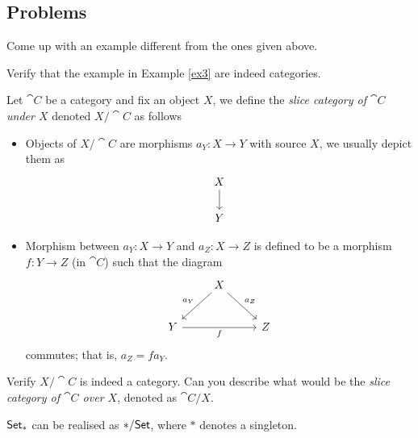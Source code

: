 

\subsection{Problems}
\vspace{0.1in}

\begin{problem}\label{prob 1.1}
Come up with an example different from the ones given above.
\end{problem}

\vspace{0.1in}

\begin{problem}\label{prob 1.2}
Verify that the example in Example \ref{ex3} are indeed categories.
\end{problem}

\vspace{0.1in}

\begin{problem}\label{prob 1.3}
Let $\cat{C}$ be a category and fix an object $X$, we define the \emph{slice category of $\cat{C}$ under $X$} denoted $X/\cat{C}$ as follows
\begin{itemize}
\item Objects of $X/\cat{C}$ are morphisms $a_Y:X \to Y$ with source $X$, we usually depict them as
\[\begin{tikzcd}
X \arrow[d]\\
Y          
\end{tikzcd}\]
\item Morphism between $a_Y: X \to Y$ and $a_Z: X \to Z$ is defined to be a morphism $f: Y \to Z$ (in $\cat{C}$) such that the diagram
\[\begin{tikzcd}
                   & X \arrow[ld, "a_Y"'] \arrow[rd, "a_Z"] &   \\[0.5em]
Y \arrow[rr, "f"'] &                                        & Z
\end{tikzcd}\]
commutes; that is, $a_Z = fa_Y$.
\end{itemize}
Verify $X/\cat{C}$ is indeed a category. Can you describe what would be the \emph{slice category of $\cat{C}$ over $X$}, denoted as $\cat{C}/X$.

\vspace*{0.1in}

\begin{remark}
$\mathsf{Set}_*$ can be realised as $*/\mathsf{Set}$, where $*$ denotes a singleton.
\end{remark}
\end{problem}
%
%
